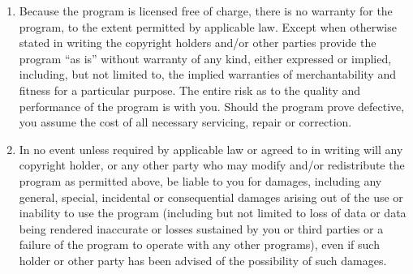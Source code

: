 {\begin{multicols}{2}
\begin{enumerate}
{\medskip\small \sc No Warranty}
\item
{\sc Because the program is licensed free of charge, there is no warranty
for the program, to the extent permitted by applicable law.  Except when
otherwise stated in writing the copyright holders and/or other parties
provide the program ``as is'' without warranty of any kind, either expressed
or implied, including, but not limited to, the implied warranties of
merchantability and fitness for a particular purpose.  The entire risk as
to the quality and performance of the program is with you.  Should the
program prove defective, you assume the cost of all necessary servicing,
repair or correction.}

\item
{\sc In no event unless required by applicable law or agreed to in writing
will any copyright holder, or any other party who may modify and/or
redistribute the program as permitted above, be liable to you for damages,
including any general, special, incidental or consequential damages arising
out of the use or inability to use the program (including but not limited
to loss of data or data being rendered inaccurate or losses sustained by
you or third parties or a failure of the program to operate with any other
programs), even if such holder or other party has been advised of the
possibility of such damages.}

\end{enumerate}
\end{multicols}
} %

\pagebreak[2]

